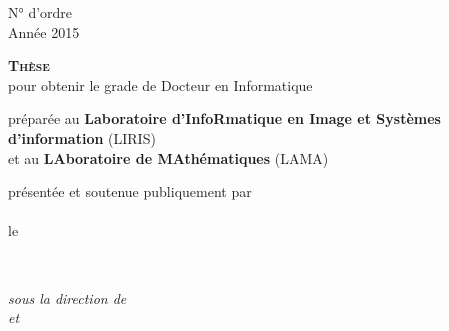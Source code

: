 %
%
%
\begin{titlepage}
	\begin{flushright}
		N° d'ordre \thesisOrderNumber\\
		Année 2015
	\end{flushright}

	\begin{addmargin}[-3.5cm]{-3cm}
    \begin{center}
        \large

        \hfill

        \textsc{\Large\textbf{Thèse}}\\
        pour obtenir le grade de {Docteur} en {Informatique} \\ \bigskip



        préparée au \textbf{\normalsize Laboratoire d'InfoRmatique en Image et Systèmes d'information} (LIRIS)\\%
        et au \textbf{\normalsize LAboratoire de MAthématiques} (LAMA)\\ \medskip %


        présentée et soutenue publiquement par \\
        \textsc{\Large\textbf{\sayMyName}} \\
        le \textsc{\thesisDate}

        \vfill

        \begingroup
            \color{Maroon}\huge{\textsc{\thesisTitle}} \\ %
        \endgroup




        \textit{sous la direction de \\
        \textbf{\thesisFirstSupervisor} et \textbf{\thesisSecondSupervisor}} \\ %


\end{center}
\end{addmargin}
\end{titlepage}
